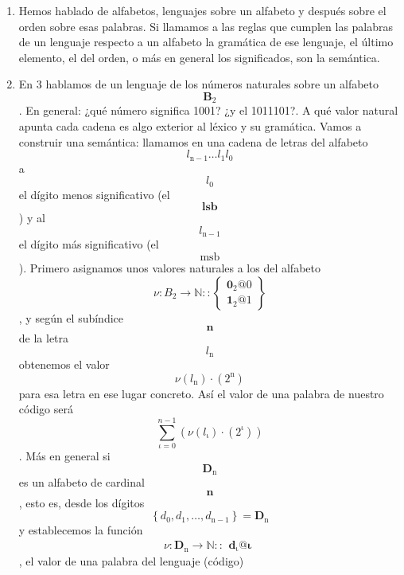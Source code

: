 \documentclass[
]{article}
\begin{document}
\begin{enumerate}
\begin{enumerate}
    Podéis ver que en los códigos antes explicitados y sus propiedades
    hacen referencia necesaria a algo más que al conjunto de las
    palabras de un lenguaje, que se puede re\-sumir en un orden en las
    palabras. Esto viene dado normalmente por el significado de las
    palabras.
  \item
    Hemos hablado de alfabetos, lenguajes sobre un alfabeto y después
    sobre el orden sobre esas palabras. Si llamamos a las reglas que
    cumplen las palabras de un lenguaje respecto a un alfabeto la
    gramática de ese lenguaje, el último elemento, el del orden, o más
    en general los significados, son la semántica.
  \item
    En 3 hablamos de un lenguaje de los números naturales sobre un
    alfabeto \[\mathbf{B}_{\mathbf{\mathrm{2}}}\]. En general: ¿qué
    número significa 1001? ¿y el 1011101?. A qué valor natural apunta
    cada cadena es algo exterior al léxico y su gramática. Vamos a
    construir una semánti\-ca: llamamos en una cadena de letras del
    alfabeto
    \[l_{\mathbf{\mathrm{n - 1}}}\ldots l_{\mathbf{\mathrm{1}}}l_{\mathbf{\mathrm{0}}}\]a
    \[l_{\mathbf{\mathrm{0}}}\]el dígito me\-nos significativo
    (el\textbf{\[\mathbf{lsb}\]}) y al\[l_{\mathbf{\mathrm{n - 1}}}\]el
    dígito más significativo (el \textbf{\[\mathbf{\mathrm{msb}}\]}).
    Pri\-mero asignamos unos valores naturales a los del alfabeto
    \[\nu:{B_{\mathbf{\mathrm{2}}}\rightarrow\mathbf{\mathbb{N}}}::\begin{Bmatrix}
    {\mathbf{0_{\mathrm{2}}}@0} \\
    {\mathbf{1_{\mathrm{2}}}@1}
    \end{Bmatrix}\], y según el subíndice \[\mathbf{n}\] de la letra
    \[l_{\mathbf{\mathrm{n}}}\] obtenemos el valor
    \[\nu{{(l_{\mathbf{\mathrm{n}}})} \cdot {(2^{\mathbf{\mathrm{n}}})}}\]
    para esa letra en ese lugar concreto. Así el valor de una palabra de
    nuestro código será
    \[\sum\limits_{\iota = 0}^{n - 1}{({\nu{{(l_{\mathbf{\mathrm{\iota}}})} \cdot {(2^{\mathbf{\mathrm{\iota}}})}}})}\].
    Más en general si \[\mathbf{D}_{\mathbf{\mathrm{n}}}\]es un alfabeto
    de cardinal \[\mathbf{n}\], esto es, desde los dígitos
    \[\left\{ {d_{\mathbf{\mathrm{0}}},d_{\mathbf{\mathrm{1}}},\ldots,d_{\mathbf{\mathrm{n - 1}}}} \right\} = \mathbf{D}_{\mathbf{\mathrm{n}}}\]y
    establecemos la función
    \[\nu:{\mathbf{D}_{\mathbf{\mathrm{n}}}\rightarrow\mathbf{\mathbb{N}}}::\begin{matrix}
    {\mathbf{d_{\mathrm{\iota}}}@\mathbf{\iota}}
    \end{matrix}\], el valor de una palabra del lenguaje (código)

\end{enumerate}
\end{enumerate}
\end{document}
